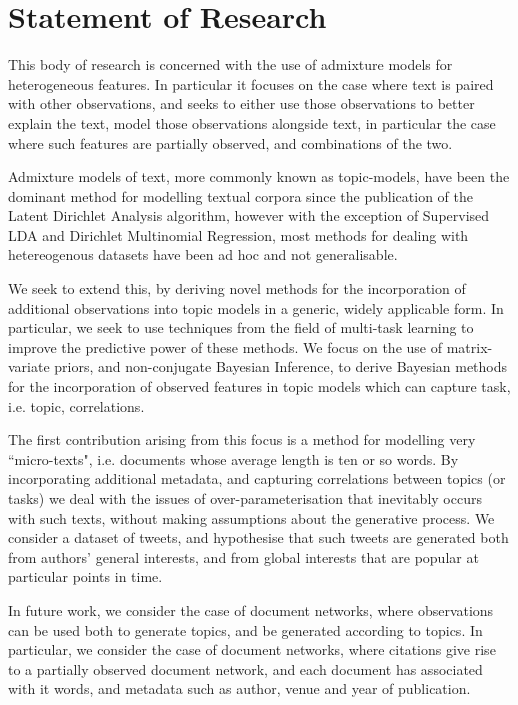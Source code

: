 

\section{Statement of Research}
This body of research is concerned with the use of admixture models for heterogeneous features. In particular it focuses on the case where text is paired with other observations, and seeks to either use those observations to better explain the text, model those observations alongside text, in particular the case where such features are partially observed, and combinations of the two.

Admixture models of text, more commonly known as topic-models, have been the dominant method for modelling textual corpora since the publication of the Latent Dirichlet Analysis algorithm\cite{BleiNgJordan2003}, however with the exception of Supervised LDA\cite{Blei2008} and Dirichlet Multinomial Regression\cite{Mimno2008}, most methods for dealing with hetereogenous datasets have been ad hoc and not generalisable.

We seek to extend this, by deriving novel methods for the incorporation of additional observations into topic models in a generic, widely applicable form. In particular, we seek to use techniques from the field of multi-task learning to improve the predictive power of these methods. We focus on the use of matrix-variate priors, and non-conjugate Bayesian Inference, to derive Bayesian methods for the incorporation of observed features in topic models which can capture task, i.e. topic, correlations.

The first contribution arising from this focus is a method for modelling very ``micro-texts", i.e. documents whose average length is ten or so words. By incorporating additional metadata, and capturing correlations between topics (or tasks) we deal with the issues of over-parameterisation that inevitably occurs with such texts, without making assumptions about the generative process. We consider a dataset of tweets, and hypothesise that such tweets are generated both from authors' general interests, and from global interests that are popular at particular points in time.

In future work, we consider the case of document networks, where observations can be used both to generate topics, and be generated according to topics. In particular, we consider the case of document networks, where citations give rise to a partially observed document network, and each document has associated with it words, and metadata such as author, venue and year of publication.
\clearpage

